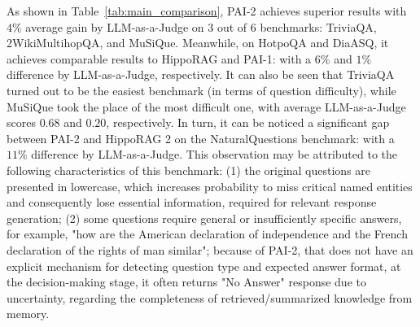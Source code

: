 As shown in Table~\ref{tab:main_comparison}, PAI-2 achieves superior results with $4\%$ average gain by LLM-as-a-Judge on 3 out of 6 benchmarks: TriviaQA, 2WikiMultihopQA, and MuSiQue. Meanwhile, on HotpoQA and DiaASQ, it achieves comparable results to HippoRAG and PAI-1: with a $6\%$ and $1\%$ difference by LLM-as-a-Judge, respectively. It can also be seen that TriviaQA turned out to be the easiest benchmark (in terms of question difficulty), while MuSiQue took the place of the most difficult one, with average LLM-as-a-Judge scores $0.68$ and $0.20$, respectively. In turn, it can be noticed a significant gap between PAI-2 and HippoRAG 2 on the NaturalQuestions benchmark: with a $11\%$ difference by LLM-as-a-Judge. This observation may be attributed to the following characteristics of this benchmark: (1) the original questions are presented in lowercase, which increases probability to miss critical named entities and consequently lose essential information, required for relevant response generation; (2) some questions require general or insufficiently specific answers, for example, "how are the American declaration of independence and the French declaration of the rights of man similar"; because of PAI-2, that does not have an explicit mechanism for detecting question type and expected answer format, at the decision-making stage, it often returns "No Answer" response due to uncertainty, regarding the completeness of retrieved/summarized knowledge from memory.

